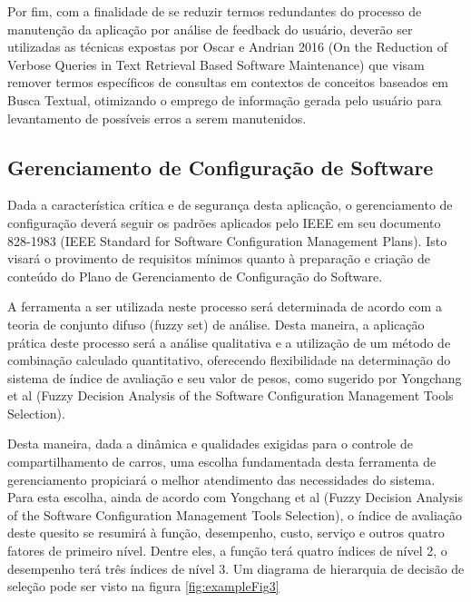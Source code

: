 \documentclass[12pt]{article}
\begin{document}
Por fim, com a finalidade de se reduzir termos redundantes do processo de manutenção da aplicação por análise de feedback do usuário, deverão ser utilizadas as técnicas expostas por Oscar e Andrian 2016  (On the Reduction of Verbose Queries in Text Retrieval Based Software Maintenance) que visam remover termos específicos de consultas em contextos de conceitos baseados em Busca Textual, otimizando o emprego de informação gerada pelo usuário para levantamento de possíveis erros a serem manutenidos.

\subsection{Gerenciamento de Configuração de Software}

Dada a característica crítica e de segurança desta aplicação, o gerenciamento de configuração deverá seguir os padrões aplicados pelo IEEE em seu documento 828-1983 (IEEE Standard for Software Configuration Management Plans). Isto visará o provimento de requisitos mínimos quanto à preparação e criação de conteúdo do Plano de Gerenciamento de Configuração do Software.

A ferramenta a ser utilizada neste processo será determinada de acordo com a teoria de conjunto difuso (fuzzy set) de análise. Desta maneira, a aplicação prática deste processo será a análise qualitativa e a utilização de um método de combinação calculado quantitativo, oferecendo flexibilidade na determinação do sistema de índice de avaliação e seu valor de pesos, como sugerido por Yongchang et al (Fuzzy Decision Analysis of the Software Configuration Management Tools Selection).

Desta maneira, dada a dinâmica e qualidades exigidas para o controle de compartilhamento de carros, uma escolha fundamentada desta ferramenta de gerenciamento propiciará o melhor atendimento das necessidades do sistema. Para esta escolha, ainda de acordo com Yongchang et al (Fuzzy Decision Analysis of the Software Configuration Management Tools Selection), o índice de avaliação deste quesito se resumirá à função, desempenho, custo, serviço e outros quatro fatores de primeiro nível. Dentre eles, a função terá quatro índices de nível 2, o desempenho terá três índices de nível 3. Um diagrama de hierarquia de decisão de seleção pode ser visto na figura \ref{fig:exampleFig3}
\end{document}
